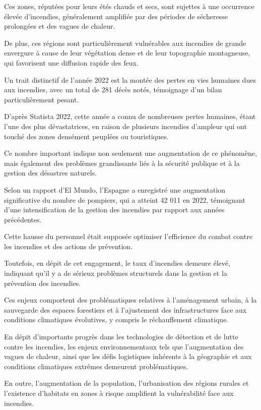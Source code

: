 \documentclass[
]{article}
\begin{document}
Ces zones, réputées pour leurs étés chauds et secs, sont sujettes à une
occurrence élevée d'incendies, généralement amplifiée par des périodes
de sécheresse prolongées et des vagues de chaleur.

De plus, ces régions sont particulièrement vulnérables aux incendies de
grande envergure à cause de leur végétation dense et de leur topographie
montagneuse, qui favorisent une diffusion rapide des feux.

Un trait distinctif de l'année 2022 est la montée des pertes en vies
humaines dues aux incendies, avec un total de 281 décès notés,
témoignage d'un bilan particulièrement pesant.

D'après Statista 2022, cette année a connu de nombreuses pertes
humaines, étant l'une des plus dévastatrices, en raison de plusieurs
incendies d'ampleur qui ont touché des zones densément peuplées ou
touristiques.

Ce nombre important indique non seulement une augmentation de ce
phénomène, mais également des problèmes grandissants liés à la sécurité
publique et à la gestion des désastres naturels.

Selon un rapport d'El Mundo, l'Espagne a enregistré une augmentation
significative du nombre de pompiers, qui a atteint 42 011 en 2022,
témoignant d'une intensification de la gestion des incendies par rapport
aux années précédentes.

Cette hausse du personnel était supposée optimiser l'efficience du
combat contre les incendies et des actions de prévention.

Toutefois, en dépit de cet engagement, le taux d'incendies demeure
élevé, indiquant qu'il y a de sérieux problèmes structurels dans la
gestion et la prévention des incendies.

Ces enjeux comportent des problématiques relatives à l'aménagement
urbain, à la sauvegarde des espaces forestiers et à l'ajustement des
infrastructures face aux conditions climatiques évolutives, y compris le
réchauffement climatique.

En dépit d'importants progrès dans les technologies de détection et de
lutte contre les incendies, les enjeux environnementaux tels que
l'augmentation des vagues de chaleur, ainsi que les défis logistiques
inhérents à la géographie et aux conditions climatiques extrêmes
demeurent problématiques.

En outre, l'augmentation de la population, l'urbanisation des régions
rurales et l'existence d'habitats en zones à risque amplifient la
vulnérabilité face aux incendies.
\end{document}
